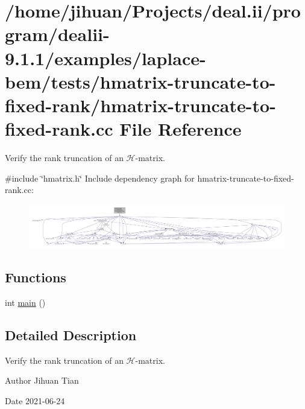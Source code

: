 \hypertarget{hmatrix-truncate-to-fixed-rank_8cc}{}\section{/home/jihuan/\+Projects/deal.ii/program/dealii-\/9.1.1/examples/laplace-\/bem/tests/hmatrix-\/truncate-\/to-\/fixed-\/rank/hmatrix-\/truncate-\/to-\/fixed-\/rank.cc File Reference}
\label{hmatrix-truncate-to-fixed-rank_8cc}


Verify the rank truncation of an $\mathcal{H}$-\/matrix.  


{\ttfamily \#include \char`\"{}hmatrix.\+h\char`\"{}}\newline
Include dependency graph for hmatrix-\/truncate-\/to-\/fixed-\/rank.cc\+:
\nopagebreak
\begin{figure}[H]
\begin{center}
\leavevmode
\includegraphics[width=350pt]{hmatrix-truncate-to-fixed-rank_8cc__incl}
\end{center}
\end{figure}
\subsection*{Functions}
\begin{DoxyCompactItemize}
\item 
int \hyperlink{hmatrix-truncate-to-fixed-rank_8cc_ae66f6b31b5ad750f1fe042a706a4e3d4}{main} ()
\end{DoxyCompactItemize}


\subsection{Detailed Description}
Verify the rank truncation of an $\mathcal{H}$-\/matrix. 

\begin{DoxyAuthor}{Author}
Jihuan Tian 
\end{DoxyAuthor}
\begin{DoxyDate}{Date}
2021-\/06-\/24 
\end{DoxyDate}


